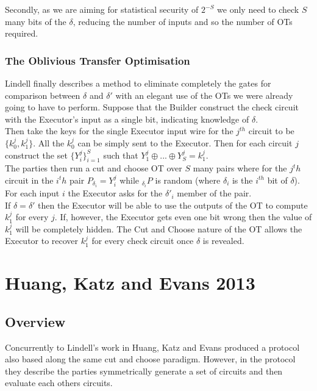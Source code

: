 \documentclass[ %
                    author={Nicholas Tutte},
                supervisor={Prof. Nigel Smart},
                    degree={MEng},
                     title={Secure Two Party Computation},
                  subtitle={A practical comparison of recent protocols},
                      type={Research - GG1K},
                      year={2015} ]{dissertation}
\begin{document}
				Secondly, as we are aiming for statistical security of $2^{-S}$ we only need to check $S$ many bits of the $\delta$, reducing the number of inputs and so the number of OTs required.

				\subsubsection{The Oblivious Transfer Optimisation}
					Lindell finally describes a method to eliminate completely the gates for comparison between $\delta$ and $\delta'$ with an elegant use of the OTs we were already going to have to perform. Suppose that the Builder construct the check circuit with the Executor's input as a single bit, indicating knowledge of $\delta$.\\

					Then take the keys for the single Executor input wire for the $j^{th}$ circuit to be $\{k_0^j, k_1^j\}$. All the $k_0^j$ can be simply sent to the Executor. Then for each circuit $j$ construct the set $\{Y_i^j\}_{i = 1}^{S}$ such that $Y_1^j \oplus ... \oplus Y_S^j = k_1^j$.\\

					The parties then run a cut and choose OT over $S$ many pairs where for the $j^th$ circuit in the $i^th$ pair $P_{\delta_i} = Y_i^j$ while $_{\delta_i}P$ is random (where $\delta_i$ is the $i^{th}$ bit of $\delta$). For each input $i$ the Executor asks for the $\delta'_i$ member of the pair.\\

					If $\delta = \delta'$ then the Executor will be able to use the outputs of the OT to compute $k_1^j$ for every $j$. If, however, the Executor gets even one bit wrong then the value of $k_1^j$ will be completely hidden. The Cut and Choose nature of the OT allows the Executor to recover $k_1^j$ for every check circuit once $\delta$ is revealed.

				

		\section{Huang, Katz and Evans 2013}
			\subsection*{Overview}

				Concurrently to Lindell's work in \cite{Lindell_CnC_2013} Huang, Katz and Evans produced a protocol also based along the same cut and choose paradigm. However, in the protocol they describe the parties symmetrically generate a set of circuits and then evaluate each others circuits.\\
\end{document}
